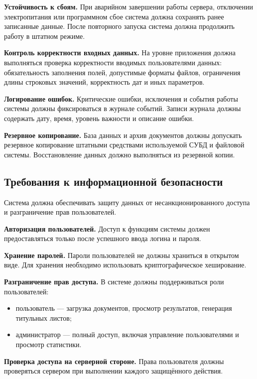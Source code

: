 \textbf{Устойчивость к сбоям.}
При аварийном завершении работы сервера, отключении электропитания или программном сбое система должна сохранять ранее записанные данные. После повторного запуска система должна продолжить работу в штатном режиме.

\textbf{Контроль корректности входных данных.}
На уровне приложения должна выполняться проверка корректности вводимых пользователями данных: обязательность заполнения полей, допустимые форматы файлов, ограничения длины строковых значений, корректность дат и иных параметров.

\textbf{Логирование ошибок.}
Критические ошибки, исключения и события работы системы должны фиксироваться в журнале событий. Записи журнала должны содержать дату, время, уровень важности и описание ошибки.

\textbf{Резервное копирование.}
База данных и архив документов должны допускать резервное копирование штатными средствами используемой СУБД и файловой системы. Восстановление данных должно выполняться из резервной копии.

\subsection{Требования к информационной безопасности}

Система должна обеспечивать защиту данных от несанкционированного доступа и разграничение прав пользователей.

\textbf{Авторизация пользователей.}
Доступ к функциям системы должен предоставляться только после успешного ввода логина и пароля.

\textbf{Хранение паролей.}
Пароли пользователей не должны храниться в открытом виде. Для хранения необходимо использовать криптографическое хеширование.

\textbf{Разграничение прав доступа.}
В системе должны поддерживаться роли пользователей:

\begin{itemize}
	\item пользователь --- загрузка документов, просмотр результатов, генерация титульных листов;
	\item администратор --- полный доступ, включая управление пользователями и просмотр статистики.
\end{itemize}

\textbf{Проверка доступа на серверной стороне.}
Права пользователя должны проверяться сервером при выполнении каждого защищённого действия.

